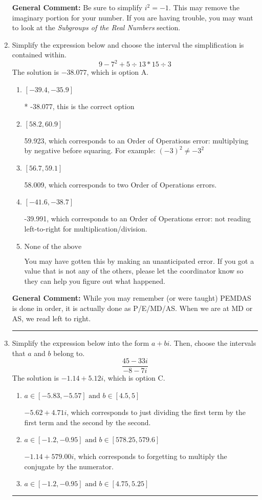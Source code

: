 \documentclass{extbook}[14pt]
\newcommand{\litem}[1]{\item #1

\rule{\textwidth}{0.4pt}}
\begin{document}
\begin{enumerate}
{\textbf{General Comment:} Be sure to simplify $i^2 = -1$. This may remove the imaginary portion for your number. If you are having trouble, you may want to look at the \textit{Subgroups of the Real Numbers} section.
}
\litem{
Simplify the expression below and choose the interval the simplification is contained within.
\[ 9 - 7^2 + 5 \div 13 * 15 \div 3 \]
The solution is \( -38.077 \), which is option A.\begin{enumerate}[label=\Alph*.]
\item \( [-39.4, -35.9] \)

* -38.077, this is the correct option
\item \( [58.2, 60.9] \)

 59.923, which corresponds to an Order of Operations error: multiplying by negative before squaring. For example: $(-3)^2 \neq -3^2$
\item \( [56.7, 59.1] \)

 58.009, which corresponds to two Order of Operations errors.
\item \( [-41.6, -38.7] \)

 -39.991, which corresponds to an Order of Operations error: not reading left-to-right for multiplication/division.
\item \( \text{None of the above} \)

 You may have gotten this by making an unanticipated error. If you got a value that is not any of the others, please let the coordinator know so they can help you figure out what happened.
\end{enumerate}

\textbf{General Comment:} While you may remember (or were taught) PEMDAS is done in order, it is actually done as P/E/MD/AS. When we are at MD or AS, we read left to right.
}
\litem{
Simplify the expression below into the form $a+bi$. Then, choose the intervals that $a$ and $b$ belong to.
\[ \frac{45 - 33 i}{-8 - 7 i} \]
The solution is \( -1.14  + 5.12 i \), which is option C.\begin{enumerate}[label=\Alph*.]
\item \( a \in [-5.83, -5.57] \text{ and } b \in [4.5, 5] \)

 $-5.62  + 4.71 i$, which corresponds to just dividing the first term by the first term and the second by the second.
\item \( a \in [-1.2, -0.95] \text{ and } b \in [578.25, 579.6] \)

 $-1.14  + 579.00 i$, which corresponds to forgetting to multiply the conjugate by the numerator.
\item \( a \in [-1.2, -0.95] \text{ and } b \in [4.75, 5.25] \)


\end{enumerate}}
\end{enumerate}
\end{document}
